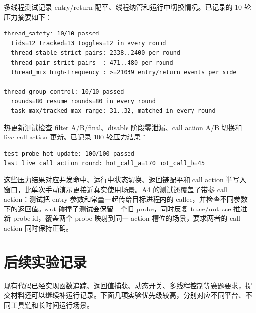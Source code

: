 \documentclass[UTF8,a4paper,11pt,fontset=fandol]{ctexart}
\begin{document}
多线程测试记录 entry/return 配平、线程纳管和运行中切换情况。已记录的 10 轮压力摘要如下：

\begin{lstlisting}
thread_safety: 10/10 passed
  tids=12 tracked=13 toggles=12 in every round
  thread_stable strict pairs: 2338..2400 per round
  thread_pair strict pairs  : 471..480 per round
  thread_mix high-frequency : >=21039 entry/return events per side

thread_group_control: 10/10 passed
  rounds=80 resume_rounds=80 in every round
  task_max/tracked_max range: 31..32, matched in every round
\end{lstlisting}

热更新测试检查 filter A/B/final、disable 阶段零泄漏、call action A/B 切换和 live call action 更新。已记录 100 轮压力结果：

\begin{lstlisting}
test_probe_hot_update: 100/100 passed
last live call action round: hot_call_a=170 hot_call_b=45
\end{lstlisting}

这些压力结果对应并发命中、运行中状态切换、返回链配平和 call action 半写入窗口，比单次手动演示更接近真实使用场景。A4 的测试还覆盖了带参 call action：测试把 entry 参数和常量一起传给目标进程内的 callee，并检查不同参数下的返回值。slot 碰撞子测试会保留一个旧 probe，同时反复 trace/untrace 推进新 probe id，覆盖两个 probe 映射到同一 action 槽位的场景，要求两者的 call action 同时保持正确。

\section{后续实验记录}

现有代码已经实现函数追踪、返回值捕获、动态开关、多线程控制等赛题要求，提交材料还可以继续补运行记录。下面几项实验优先级较高，分别对应不同平台、不同工具链和长时间运行场景。
\end{document}
